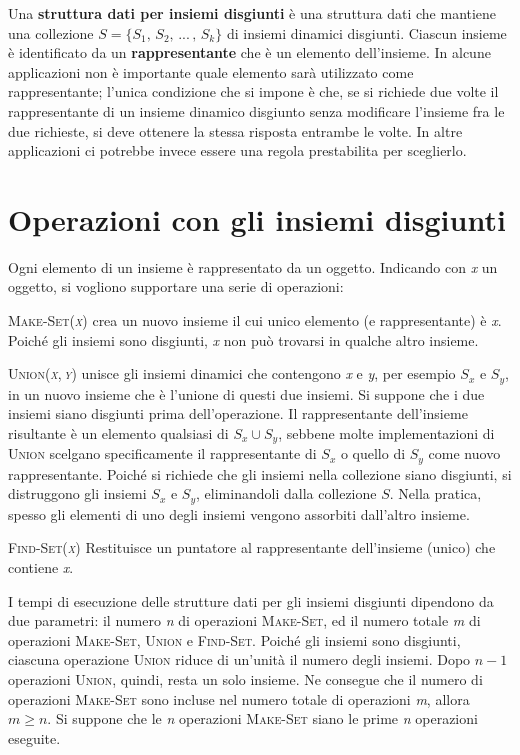 \documentclass[10pt, a4paper]{report}
\begin{document}
Una \textbf{struttura dati per insiemi disgiunti} è una struttura dati che mantiene una collezione $S = \{S_1,\,S_2,\,...\,,\,S_k\}$ di insiemi dinamici disgiunti. Ciascun insieme è identificato da un \textbf{rappresentante} che è un elemento dell'insieme. In alcune applicazioni non è importante quale elemento sarà utilizzato come rappresentante; l'unica condizione che si impone è che, se si richiede due volte il rappresentante di un insieme dinamico disgiunto senza modificare l'insieme fra le due richieste, si deve ottenere la stessa risposta entrambe le volte. In altre applicazioni ci potrebbe invece essere una regola prestabilita per sceglierlo.
\section{Operazioni con gli insiemi disgiunti}
Ogni elemento di un insieme è rappresentato da un oggetto. Indicando con \textit{x} un oggetto, si vogliono supportare una serie di operazioni:
\begin{description}
\item\textsc{Make-Set(\textit{x})} crea un nuovo insieme il cui unico elemento (e rappresentante) è \textit{x}. Poiché gli insiemi sono disgiunti, \textit{x} non può trovarsi in qualche altro insieme.
\item\textsc{Union(\textit{x},\,\textit{y})} unisce gli insiemi dinamici che contengono \textit{x} e \textit{y}, per esempio $S_x$ e $S_y$, in un nuovo insieme che è l'unione di questi due insiemi. Si suppone che i due insiemi siano disgiunti prima dell'operazione. Il rappresentante dell'insieme risultante è un elemento qualsiasi di $S_x \cup S_y$, sebbene molte implementazioni di \textsc{Union} scelgano specificamente il rappresentante di $S_x$ o quello di $S_y$ come nuovo rappresentante. Poiché si richiede che gli insiemi nella collezione siano disgiunti, si distruggono gli insiemi $S_x$ e $S_y$, eliminandoli dalla collezione $S$. Nella pratica, spesso gli elementi di uno degli insiemi vengono assorbiti dall'altro insieme.
\item\textsc{Find-Set(\textit{x})} Restituisce un puntatore al rappresentante dell'insieme (unico) che contiene \textit{x}.
\end{description}
I tempi di esecuzione delle strutture dati per gli insiemi disgiunti dipendono da due parametri: il numero \textit{n} di operazioni \textsc{Make-Set}, ed il numero totale \textit{m} di operazioni \textsc{Make-Set}, \textsc{Union} e \textsc{Find-Set}. Poiché gli insiemi sono disgiunti, ciascuna operazione \textsc{Union} riduce di un'unità il numero degli insiemi. Dopo $n - 1$ operazioni \textsc{Union}, quindi, resta un solo insieme. Ne consegue che il numero di operazioni \textsc{Make-Set} sono incluse nel numero totale di operazioni \textit{m}, allora $m \geq n$. Si suppone che le \textit{n} operazioni \textsc{Make-Set} siano le prime \textit{n} operazioni eseguite.
\end{document}
